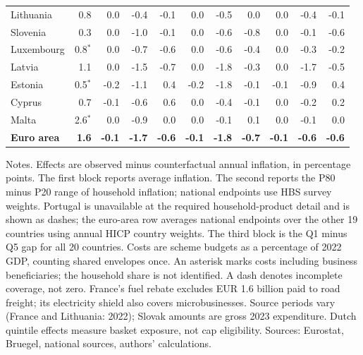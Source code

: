 \begin{table}[H]
{\begin{tabular}{l*{10}{r}}
Lithuania & 0.8 & 0.0 & -0.4 & -0.1 & 0.0 & -0.5 & 0.0 & 0.0 & -0.4 & -0.1\\
Slovenia & 0.3 & 0.0 & -1.0 & -0.1 & 0.0 & -0.6 & -0.8 & 0.0 & -0.1 & -0.6\\
\addlinespace
Luxembourg & 0.8$^{*}$ & 0.0 & -0.7 & -0.6 & 0.0 & -0.6 & -0.4 & 0.0 & -0.3 & -0.2\\
Latvia & 1.1 & 0.0 & -1.5 & -0.7 & 0.0 & -1.8 & -0.3 & 0.0 & -1.7 & -0.5\\
Estonia & 0.5$^{*}$ & -0.2 & -1.1 & 0.4 & -0.2 & -1.8 & -0.1 & -0.1 & -0.9 & 0.4\\
Cyprus & 0.7 & -0.1 & -0.6 & 0.6 & 0.0 & -0.4 & -0.1 & 0.0 & -0.2 & 0.2\\
Malta & 2.6$^{*}$ & 0.0 & -0.9 & 0.0 & 0.0 & -0.1 & 0.1 & 0.0 & -0.1 & 0.0\\
\addlinespace
\textbf{Euro area} & \textbf{1.6} & \textbf{-0.1} & \textbf{-1.7} & \textbf{-0.6} & \textbf{-0.1} & \textbf{-1.8} & \textbf{-0.7} & \textbf{-0.1} & \textbf{-0.6} & \textbf{-0.6}\\
\bottomrule
\end{tabular}%
}
\begin{flushleft}
\scriptsize{Notes. Effects are observed minus counterfactual annual inflation, in percentage points. The first block reports average inflation. The second reports the P80 minus P20 range of household inflation; national endpoints use HBS survey weights. Portugal is unavailable at the required household-product detail and is shown as dashes; the euro-area row averages national endpoints over the other 19 countries using annual HICP country weights. The third block is the Q1 minus Q5 gap for all 20 countries. Costs are scheme budgets as a percentage of 2022 GDP, counting shared envelopes once. An asterisk marks costs including business beneficiaries; the household share is not identified. A dash denotes incomplete coverage, not zero. France's fuel rebate excludes EUR 1.6 billion paid to road freight; its electricity shield also covers microbusinesses. Source periods vary (France and Lithuania: 2022); Slovak amounts are gross 2023 expenditure. Dutch quintile effects measure basket exposure, not cap eligibility. Sources: Eurostat, Bruegel, national sources, authors' calculations.}
\end{flushleft}
\end{table}
